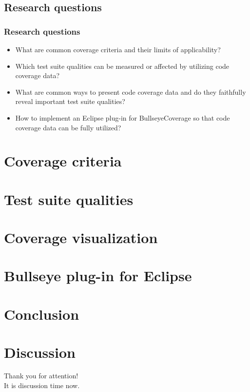 \documentclass{beamer}
\begin{document}
\subsection{Research questions}

\begin{frame}
  \frametitle{Research questions}
\begin{itemize}
  \item What are common coverage criteria and their limits of applicability?
  \pause
  \item Which test suite qualities can be measured or affected by utilizing code coverage data?
  \pause
  \item What are common ways to present code coverage data and do they faithfully reveal
important test suite qualities?
  \pause
  \item How to implement an Eclipse plug-in for BullseyeCoverage so that code coverage data
can be fully utilized?
\end{itemize}
\end{frame}


\section{Coverage criteria}


\section{Test suite qualities}


\section{Coverage visualization}


\section{Bullseye plug-in for Eclipse}


\section{Conclusion}


\section{Discussion}

\begin{frame}
\begin{center}
  Thank you for attention!\\
  It is discussion time now.
\end{center}
\end{frame}
\end{document}
